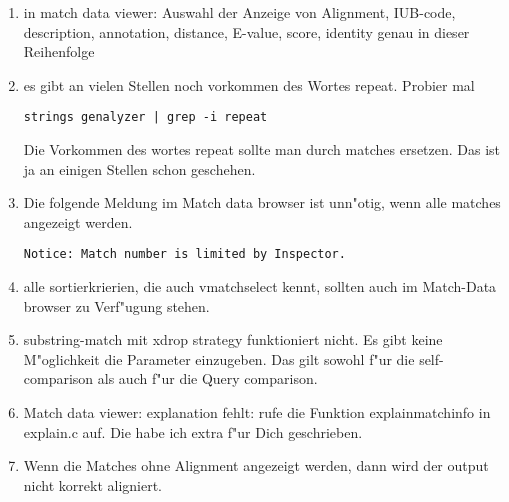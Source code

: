 \documentclass[12pt]{article}
\begin{document}
\begin{enumerate}
\item
in match data viewer: Auswahl der Anzeige von
Alignment, IUB-code, description, annotation, 
distance, E-value, score, identity
genau in dieser Reihenfolge
\item
es gibt an vielen Stellen noch vorkommen des Wortes repeat.
Probier mal 

\texttt{strings genalyzer | grep -i repeat}

Die Vorkommen des wortes repeat sollte man durch matches ersetzen.
Das ist ja an einigen Stellen schon geschehen.

\item
Die folgende Meldung im Match data browser ist unn"otig, wenn alle matches
angezeigt werden.

\texttt{Notice: Match number is limited by Inspector.}
\item
alle sortierkrierien, die auch vmatchselect kennt, sollten auch im
Match-Data browser zu Verf"ugung stehen.
\item
substring-match mit xdrop strategy funktioniert nicht. Es gibt keine
M"oglichkeit die Parameter einzugeben. Das gilt sowohl
f"ur die self-comparison als auch f"ur die Query comparison.
\item
Match data viewer:
explanation fehlt: rufe die Funktion explainmatchinfo in explain.c
auf. Die habe ich extra f"ur Dich geschrieben.
\item
Wenn die Matches ohne Alignment angezeigt werden,
dann wird der output nicht korrekt aligniert.
\end{enumerate}
\end{document}
